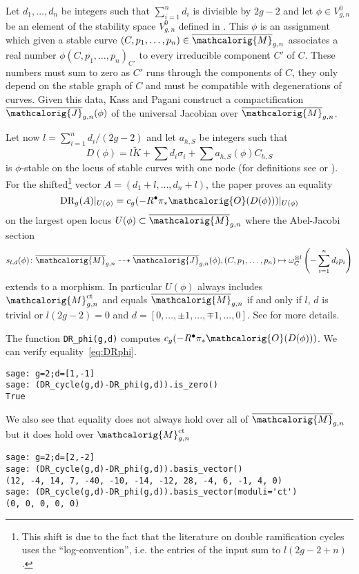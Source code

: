 \documentclass[11pt]{article}
\newcommand{\M}{\ensuremath{\overline{\mathcalorig{M}}}}
\begin{document}
Let $d_1,...,d_n$ be integers such that $\sum_{i=1}^n d_i$ is divisible by $2g-2$ and let $\phi \in V_{g,n}^0$ be an element of the stability space $V_{g,n}^0$ defined in \cite[Definition 3.2]{KassPagani1}. This $\phi$ is an assignment which given a stable curve $(C,p_1, \ldots, p_n) \in \M_{g,n}$ associates a real number $\phi(C,p_1, \ldots, p_n)_{C'}$ to every irreducible component $C'$ of $C$. These numbers must sum to zero as $C'$ runs through the components of $C$, they only depend on the stable graph of $C$ and must be compatible with degenerations of curves. Given this data, Kass and Pagani construct a compactification $\overline{\mathcalorig{J}}_{g,n}(\phi)$ of the universal Jacobian over $\M_{g,n}$.

Let now $l=\sum_{i=1}^n d_i /(2g-2)$ and let $a_{h,S}$ be integers such that
\[
 D(\phi)=l\tilde{K} + \sum d_i \sigma_i + \sum a_{h,S}(\phi) C_{h,S}
\]
is $\phi$-stable on the locus of stable curves with one node (for definitions see \cite{KassPagani1} or \cite{PRvZ}). For the shifted\footnote{This shift is due to the fact that the literature on double ramification cycles uses the ``log-convention'', i.e. the entries of the input sum to $l(2g-2+n)$.} vector $A=(d_1+l, \ldots, d_n+l)$, the paper \cite{HKP} proves an equality
\begin{equation}\label{eq:DRphi}
\textup{DR}_g(A)|_{U(\phi)} = c_g(-R^\bullet \pi_* \mathcalorig{O}(D(\phi)))|_{U(\phi)}
\end{equation}
on the largest open locus $U(\phi)\subset \M_{g,n}$ where the Abel-Jacobi section 
$$s_{l,d}(\phi)\colon  \M_{g,n}  \dashrightarrow \overline{\mathcalorig{J}}_{g,n}(\phi), (C,p_1, \ldots, p_n) \mapsto \omega_C^{\otimes l}\left( - \sum_{i=1}^n d_i p_i\right)$$
extends to a morphism. In particular $U(\phi)$ always includes $\mathcalorig{M}_{g,n}^{\text{ct}}$ and equals $\M_{g,n}$ if and only if $l$, $d$ is trivial or  $l(2g-2)=0$ and $d=[0,...,\pm 1,...,\mp 1, ...,0]$. See \cite[Section 4.3]{PRvZ} for more details.



The function \verb|DR_phi(g,d)| computes $c_g(-R^\bullet \pi_* \mathcalorig{O}(D(\phi)))$. We can verify equality~\eqref{eq:DRphi}.
\begin{lstlisting}
sage: g=2;d=[1,-1]
sage: (DR_cycle(g,d)-DR_phi(g,d)).is_zero()
True
\end{lstlisting}
We also see that equality does not always hold over all of $\M_{g,n}$ but it does hold over $\mathcalorig{M}_{g,n}^\textup{ct}$
\begin{lstlisting}
sage: g=2;d=[2,-2]
sage: (DR_cycle(g,d)-DR_phi(g,d)).basis_vector()
(12, -4, 14, 7, -40, -10, -14, -12, 28, -4, 6, -1, 4, 0)
sage: (DR_cycle(g,d)-DR_phi(g,d)).basis_vector(moduli='ct')
(0, 0, 0, 0, 0)
\end{lstlisting}
\end{document}
